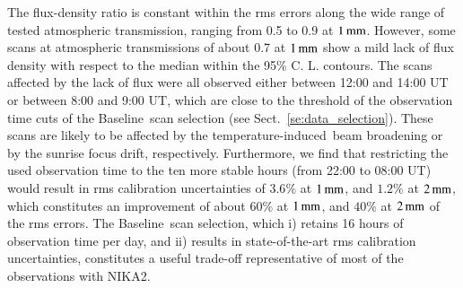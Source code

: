 \documentclass[traditionalabstract]{aa}
\newcommand{\afternoon}{temperature-induced}
\newcommand{\baseline}{Baseline}%
\newcommand{\lp}[1]{#1}
\begin{document}
{The flux-density ratio is constant within the rms errors along the
wide range of tested atmospheric transmission, ranging from 0.5 to 0.9
at $1\,\rm{mm}$.
However, some scans at atmospheric transmissions of about 0.7 at
$1\,\rm{mm}$ show a mild lack of flux density with respect to the
median within the 95\% C. L. contours. The scans
affected by the lack of flux were all observed
either between 12:00 and 14:00 UT or between 8:00 and 9:00 UT, which are close to the threshold of the observation time cuts of the \baseline\ scan selection (see
Sect.~\ref{se:data_selection}). These scans are likely
to be affected by the \afternoon\ beam broadening or by the
sunrise focus drift, respectively. Furthermore, we find that restricting the
used observation time to the ten more stable hours (from 22:00 to
08:00 UT) would result in rms calibration uncertainties of
$3.6\%$ at $1\,\rm{mm}$, and $1.2\%$ at $2\,\rm{mm}$, which constitutes an
improvement of about $60\%$ at $1\,\rm{mm}$, and $40\%$ at $2\,\rm{mm}$
of the rms errors.  
The \baseline\ scan selection, which i)
retains 16 hours of observation time
per day, and ii) 
{\lp results in state-of-the-art rms calibration
uncertainties,} constitutes {\lp a useful trade-off representative of most
of the observations with NIKA2.} 

%
%
}
\end{document}
